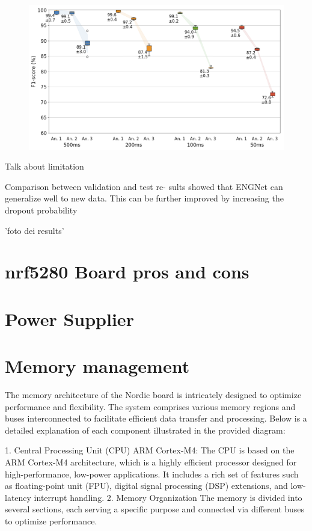 \documentclass{Configuration_Files/PoliMi3i_thesis}
\begin{document}
	\begin{figure}[H]
		\includegraphics[scale=0.3]{engNet_f1score.png}
		\centering
		\end{figure}

Talk about limitation

Comparison between validation and test re- sults showed that ENGNet can generalize well to new data. This can be further improved by increasing the dropout probability


'foto dei results'



\section{nrf5280 Board pros and cons}
\section{Power Supplier}
\section{Memory management}

The memory architecture of the Nordic board is intricately designed to optimize performance and flexibility. The system comprises various memory regions and buses interconnected to facilitate efficient data transfer and processing. Below is a detailed explanation of each component illustrated in the provided diagram:

1. Central Processing Unit (CPU)
ARM Cortex-M4: The CPU is based on the ARM Cortex-M4 architecture, which is a highly efficient processor designed for high-performance, low-power applications. It includes a rich set of features such as floating-point unit (FPU), digital signal processing (DSP) extensions, and low-latency interrupt handling.
2. Memory Organization
The memory is divided into several sections, each serving a specific purpose and connected via different buses to optimize performance.
\end{document}
